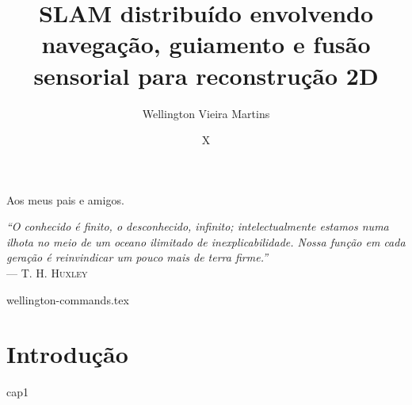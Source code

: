 \documentclass[msc, dv]{ita}
\author{Wellington Vieira Martins}{de Castro}
\title{SLAM distribuído envolvendo navegação, guiamento e fusão sensorial para reconstrução 2D}
\date{X}{dezembro}{2022}
\begin{document}
\maketitle

\begin{itadedication}
Aos meus pais e amigos.
\end{itadedication}

\begin{itathanks}

\end{itathanks}

\thispagestyle{empty}
\ifhyperref{}\fi
\begin{flushright}
\begin{spacing}{1}
\mbox{}\vfill
{\sffamily\itshape
``O conhecido é finito, o desconhecido, infinito; intelectualmente estamos numa ilhota no meio de um oceano ilimitado de inexplicabilidade. Nossa função em cada geração é reinvindicar um pouco mais de terra firme.''\\}
--- \textsc{T. H. Huxley}
\end{spacing}
\end{flushright}

\begin{abstract}
\noindent

\end{abstract}

\begin{englishabstract}
\noindent

\end{englishabstract}

{wellington-commands.tex}

\listoffigures %

\listoftables %

\listofabbreviations

\listofsymbol


\tableofcontents

\mainmatter

\chapter{Introdução}
\label{ch:intro}
{cap1}
\end{document}
